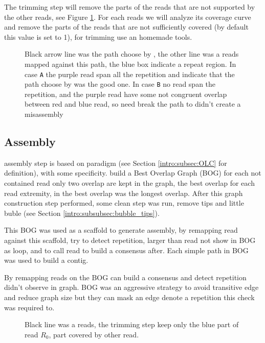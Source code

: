 \documentclass[main]{subfiles}
\begin{document}
The trimming step will remove the parts of the reads that are not supported by the other reads, see Figure \ref{sota:fig:canu:trimming}. For each reads we will analyze its coverage curve and remove the parts of the reads that are not sufficiently covered (by default this value is set to 1), for trimming \canu use an homemade tools. 


\begin{figure}[ht]
    \centering
    
    \caption{Black arrow line was the path choose by \canu, the other line was a reads mapped against this path, the blue box indicate a repeat region. In case \texttt{A} the purple read span all the repetition and indicate that the path choose by \canu was the good one. In case \texttt{B} no read span the repetition, and the purple read have some not congruent overlap between red and blue read, so \canu need break the path to didn't create a misassembly}
    \label{sota:fig:canu:trimming}
\end{figure}

\subsection{Assembly}

\canu assembly step is based on \OLC paradigm (see Section \ref{intro:subsec:OLC} for \OLC definition), with some specificity. \canu build a Best Overlap Graph (BOG) for each not contained read only two overlap are kept in the graph, the best overlap for each read extremity, in \canu the best overlap was the longest overlap. After this graph construction step performed, some clean step was run, remove tips and little buble (see Section \ref{intro:subsubsec:bubble_tips}).

This BOG was used as a scaffold to generate assembly, by remapping read against this scaffold, \canu try to detect repetition, larger than read not show in BOG as loop, and to call read to build a consensus after. Each simple path in BOG was used to build a contig. 

By remapping reads on the BOG \canu can build a consensus and detect repetition didn't observe in graph. BOG was an aggressive strategy to avoid transitive edge and reduce graph size but they can mask an edge denote a repetition this check was required to.

\begin{figure}[ht]
    \centering
    
    \caption{Black line was a reads, the \canu trimming step keep only the blue part of read $R_0$, part covered by other read.}
    \label{sota:fig:canu:remapping}
\end{figure}
\end{document}
